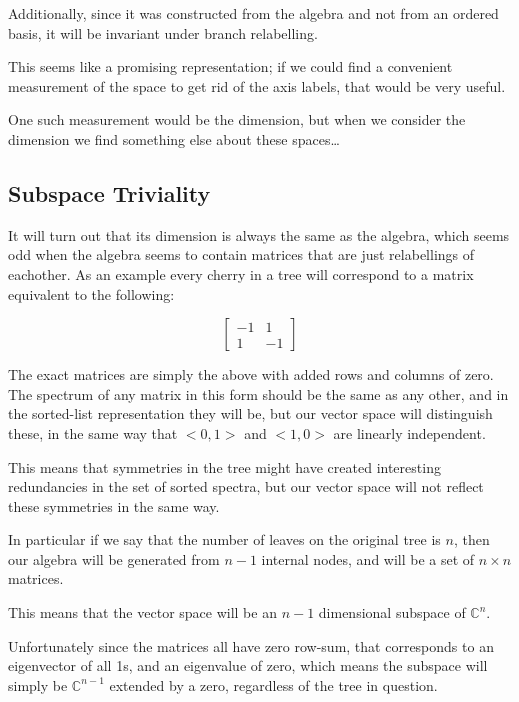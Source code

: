 \documentclass{article}
\begin{document}
Additionally, since it was constructed from the algebra and not from an ordered
basis, it will be invariant under branch relabelling.

This seems like a promising representation; if we could find a convenient
measurement of the space to get rid of the axis labels, that would be very
useful.

One such measurement would be the dimension, but when we consider the dimension
we find something else about these spaces\ldots


\subsection{Subspace Triviality}

It will turn out that its dimension is always the same as the algebra, which
seems odd when the algebra seems to contain matrices that are just relabellings
of eachother.
As an example every cherry in a tree will correspond to a matrix equivalent to
the following:

\[
	\left[ \begin{matrix}
		-1 & 1\\
		1 & -1
	\end{matrix} \right]
\]

The exact matrices are simply the above with added rows and columns of zero.
The spectrum of any matrix in this form should be the same as any other, and in
the sorted-list representation they will be, but our vector space will
distinguish these, in the same way that $<0, 1>$ and $<1, 0>$ are linearly
independent.

This means that symmetries in the tree might have created interesting
redundancies in the set of sorted spectra, but our vector space will not
reflect these symmetries in the same way.

In particular if we say that the number of leaves on the original tree is $n$,
then our algebra will be generated from $n-1$ internal nodes, and will be a set
of $n \times n$ matrices.

This means that the vector space will be an $n-1$ dimensional subspace of
$\mathds{C}^n$.

Unfortunately since the matrices all have zero row-sum, that corresponds to an
eigenvector of all 1s, and an eigenvalue of zero, which means the subspace will
simply be $\mathds{C}^{n-1}$ extended by a zero, regardless of the tree in
question.
\end{document}
